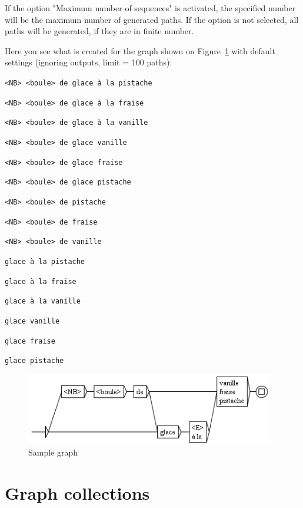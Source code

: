 \noindent If the option "Maximum number of sequences" is activated, the
specified number will be the maximum number of generated paths. If the 
option is not selected, all
paths will be generated, if they are in finite number.

\bigskip
\noindent Here you see what is created for the graph shown on
Figure~\ref{fig-glace} with default settings (ignoring outputs, limit = 100
paths):

\bigskip
\noindent
\texttt{<NB> <boule> de glace \`a la pistache}

\noindent
\texttt{<NB> <boule> de glace \`a la fraise}

\noindent
\texttt{<NB> <boule> de glace \`a la vanille}

\noindent
\texttt{<NB> <boule> de glace vanille}

\noindent
\texttt{<NB> <boule> de glace fraise}

\noindent
\texttt{<NB> <boule> de glace pistache}

\noindent
\texttt{<NB> <boule> de pistache}

\noindent
\texttt{<NB> <boule> de fraise}

\noindent
\texttt{<NB> <boule> de vanille}

\noindent
\texttt{glace \`a la pistache}

\noindent
\texttt{glace \`a la fraise}

\noindent
\texttt{glace \`a la vanille}

\noindent
\texttt{glace vanille}

\noindent
\texttt{glace fraise}

\noindent
\texttt{glace pistache}

\begin{figure}[!h]
\begin{center}
\includegraphics[width=10.9cm]{resources/img/fig6-19.png}
\caption{Sample graph \label{fig-glace}}
\end{center}
\end{figure}




\section{Graph collections}

